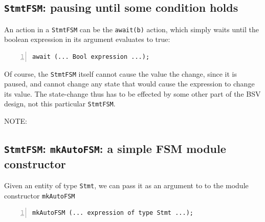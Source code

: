 \subsection{{\tt StmtFSM}: pausing until some condition holds}


An action in a \verb|StmtFSM| can be the \verb|await(b)| action, which
simply waits until the boolean expression in its argument evaluates to
true:

{\small
\begin{Verbatim}[frame=single, numbers=left]
   await (... Bool expression ...);
\end{Verbatim}
}

Of course, the \verb|StmtFSM| itself cannot cause the value the
change, since it is paused, and cannot change any state that would
cause the expression to change its value.  The state-change thus has
to be effected by some other part of the BSV design, not this
particular \verb|StmtFSM|.

\vspace{2ex}


NOTE:


\subsection{{\tt StmtFSM}: {\tt mkAutoFSM}: a simple FSM module constructor}


Given an entity of type \verb|Stmt|, we can pass it as an argument to
to the module constructor \verb|mkAutoFSM|

{\small
\begin{Verbatim}[frame=single, numbers=left]
   mkAutoFSM (... expression of type Stmt ...);
\end{Verbatim}
}


